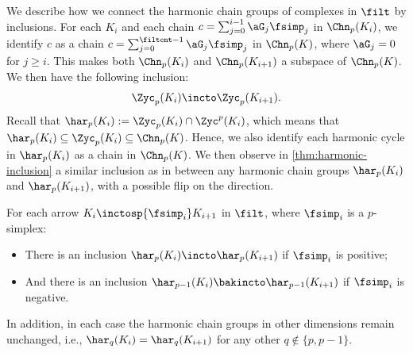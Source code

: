We describe how we connect the harmonic chain groups of complexes in $\filt$ by inclusions.
For each $K_i$ and each chain $c=\sum_{j=0}^{i-1}\aG_j\fsimp_j$ in $\Chn_p(K_i)$,
we identify $c$ as a chain $c=\sum_{j=0}^{\filtcnt-1}\aG_j\fsimp_j$ in $\Chn_p(K)$,
where $\aG_j=0$ for $j\geq i$.
This makes 
both 
$\Chn_p(K_i)$ and $\Chn_p(K_{i+1})$ a subspace of $\Chn_p(K)$. 
We then have the following inclusion:
\begin{equation}
\label{eqn:zyc-inc}
\Zyc_p(K_i) \incto \Zyc_p(K_{i+1}).
\end{equation}
Recall that $\har_p(K_i):=\Zyc_p(K_i)\cap \Zyc^p(K_i)$, which means that
$\har_p(K_i)\subseteq \Zyc_p(K_i) \subseteq \Chn_p(K)$.
Hence, we also identify each harmonic cycle in $\har_p(K_i)$ as a chain in $\Chn_p(K)$. 
We then observe in \cref{thm:harmonic-inclusion}
 a similar inclusion as in  between any harmonic chain groups $\har_p(K_i)$ and $\har_p(K_{i+1})$,
with a possible flip on the direction.
\begin{theorem}
\label{thm:harmonic-inclusion}
For each arrow $K_i \inctosp{\fsimp_i} K_{i+1}$ in $\filt$, where $\fsimp_i$ is 
a $p$-simplex:  
\begin{itemize}
\item There is an inclusion $\har_p(K_i)\incto \har_p(K_{i+1})$
if $\fsimp_i$ is positive;
\item And there is an inclusion $\har_{p-1}(K_i)\bakincto\har_{p-1}(K_{i+1})$ if $\fsimp_i$ is negative.
\end{itemize}
In addition, in each case the harmonic chain groups in other dimensions remain unchanged, i.e., $\har_q(K_i) = \har_q(K_{i+1})$ for any other $q \notin \{p, p-1\}$.
\end{theorem}
